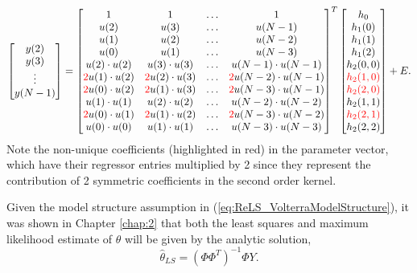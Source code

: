 \begin{equation*}
\begin{bmatrix} y(2) \\ y(3) \\ \vdots \\ y(N-1) \end{bmatrix} = 
\begin{bmatrix} 1 & 1 & \hdots & 1 \\ u(2) & u(3) & \hdots & u(N-1) \\ u(1) & u(2) & \hdots & u(N-2) \\ u(0) & u(1) & \hdots & u(N-3) \\
u(2) \cdot u(2) & u(3) \cdot u(3) & \hdots & u(N-1) \cdot u(N-1) \\ \textcolor{red}{2} u(1) \cdot u(2) & \textcolor{red}{2} u(2) \cdot u(3) & \hdots & \textcolor{red}{2} u(N-2) \cdot u(N-1) \\
\textcolor{red}{2} u(0) \cdot u(2) & \textcolor{red}{2} u(1) \cdot u(3) & \hdots & \textcolor{red}{2} u(N-3) \cdot u(N-1) \\ u(1) \cdot u(1) & u(2) \cdot u(2) & \hdots & u(N-2) \cdot u(N-2) \\
\textcolor{red}{2} u(0) \cdot u(1) & \textcolor{red}{2} u(1) \cdot u(2) & \hdots & \textcolor{red}{2} u(N-3) \cdot u(N-2) \\ u(0) \cdot u(0) & u(1) \cdot u(1) & \hdots & u(N-3) \cdot u(N-3) \end{bmatrix}^T  
\begin{bmatrix} h_0 \\ h_1(0) \\ h_1(1) \\ h_1(2) \\ h_2(0,0) \\ \textcolor{red}{h_2(1,0)} \\ \textcolor{red}{h_2(2,0)} \\ h_2(1,1) \\ \textcolor{red}{h_2(2,1)} \\ h_2(2,2) \end{bmatrix} + E.
\end{equation*}
Note the non-unique coefficients (highlighted in red) in the parameter vector, which have their regressor entries multiplied by 2 since they represent the contribution of 2 symmetric coefficients in the second order kernel.

Given the model structure assumption in (\ref{eq:ReLS_VolterraModelStructure}), it was shown in Chapter \ref{chap:2} that both the least squares and maximum likelihood estimate of $\theta$ will be given by the analytic solution,
\begin{equation}
\label{eq:LSestimator_VolterraSeries}
\hat{\theta}_{LS} = (\Phi \Phi^T)^{-1} \Phi Y.
\end{equation}

